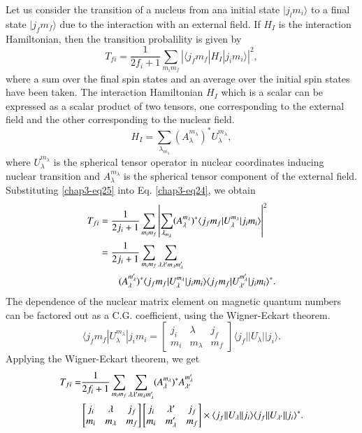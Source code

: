 Let us consider the transition of a nucleus from ana initial state $|j_l m_i \rangle$ to a final state $| j_f m_f \rangle$ due to the interaction with an external field. If $H_I$ is the interaction Hamiltonian, then the transition probalility is given by
\setcounter{equation}{23}
\begin{equation}
  T_{fi} = \frac{1}{2f_i +1} \sum_{m_i m_f} | \langle j_f m_f |H_I| j_i m_i \rangle |^2, \label{chap3-eq24}
\end{equation}
where a sum over the final spin states and an average over the initial spin states have been taken. The interaction Hamiltonian $H_I$ which is a scalar can be expressed as a scalar product of two tensors, one corresponding to the external field and the other corresponding to the nuclear field.
\begin{equation}
  H_I = \sum_{\lambda_{m_\lambda}} (A_\lambda^{m_\lambda})^\ast U_\lambda^{m_\lambda}, \label{chap3-eq25}
\end{equation}
where $U_\lambda^{m_\lambda}$ is the spherical tensor operator in nuclear coordinates inducing nuclear transition and $A_\lambda^{m_\lambda}$ is the spherical tensor component of the external field. Substituting \eqref{chap3-eq25} into Eq. \eqref{chap3-eq24}, we obtain
\begin{align}
  T_{fi} & = \frac{1}{2j_i +1} \sum_{m_im_f} \left| \sum_{\lambda_{m_\lambda}} (A_\lambda^{m_\lambda})^\ast \langle j_f m_f | U_\lambda^{m_\lambda}| j_i m_i \rangle \right|^2 \notag \\
  & = \frac{1}{2j_i +1} \sum_{m_i m_f} \sum_{\lambda \lambda' m_{\lambda} m_{\lambda}'} \notag \\
  & \qquad (A_{\lambda}^{m_\lambda'})^\ast \langle j_f m_f |U_\lambda^{m_\lambda} | j_i m_i \rangle \langle j_f m_f | U_{\lambda '}^{m_\lambda '}| j_i m_i \rangle^\ast. \label{chap3-eq26}
\end{align}
The dependence of the nuclear matrix element on magnetic quantum numbers can be factored out as a C.G. coefficient, using the Wigner-Eckart theorem.
\begin{equation}
  \langle j_f m_f | U_\lambda^{m_\lambda}| j_i m_i =
  \begin{bmatrix} j_i & \lambda & j_f\\ m_i & m_\lambda & m_f \end{bmatrix} \langle j_f || U_\lambda|| j_i \rangle . \label{chap3-eq27}
\end{equation}
Applying the Wigner-Eckart theorem, we get
\begin{align}
  T_{fi}  = & \frac{1}{2f_i+1} \sum_{m_i m_f} \sum_{\lambda \lambda' m_\lambda m_\lambda'} (A_\lambda^{m_\lambda})^\ast A_{\lambda'}^{m_\lambda'}
  \notag \\
 &  \begin{bmatrix} j_i & \lambda & j_f \\ m_i & m_\lambda & m_f\end{bmatrix}
    \begin{bmatrix} j_i & \lambda' & j_f \\ m_i & m_\lambda' & m_f\end{bmatrix}
      \times \langle j_f || U_\lambda || j_i \rangle \langle j_f || U_{\lambda'} || j_i \rangle^\ast. \label{chap3-eq28}
\end{align}
